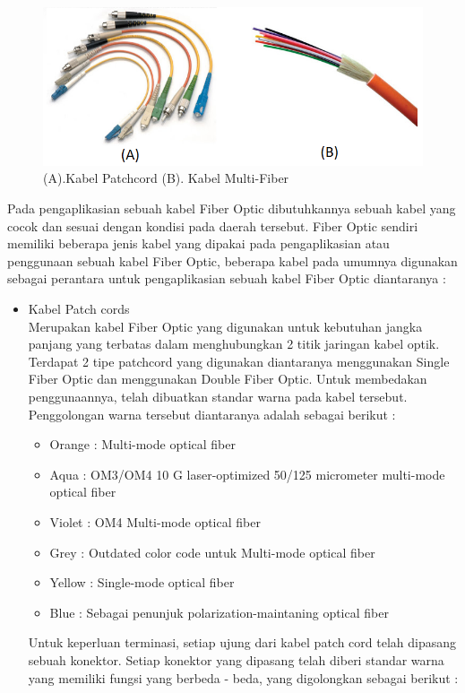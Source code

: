 \begin{flushleft}
\begin{figure}[ht]
\centerline{\includegraphics[width=1\textwidth]{figures/patchandmulti.png}}
\caption{(A).Kabel Patchcord  (B). Kabel Multi-Fiber}
\label{Skema Fiber Optic}
\end{figure}
Pada pengaplikasian sebuah kabel Fiber Optic dibutuhkannya sebuah kabel yang cocok dan sesuai dengan kondisi pada daerah tersebut. Fiber Optic sendiri memiliki beberapa jenis kabel yang dipakai pada pengaplikasian atau penggunaan sebuah kabel Fiber Optic, beberapa kabel pada umumnya digunakan sebagai perantara untuk pengaplikasian sebuah kabel Fiber Optic diantaranya : 
\begin{itemize}
\item Kabel Patch cords \\ Merupakan kabel Fiber Optic yang digunakan untuk kebutuhan jangka panjang yang terbatas dalam menghubungkan 2 titik jaringan kabel optik. Terdapat 2 tipe patchcord yang digunakan diantaranya menggunakan Single Fiber Optic dan menggunakan Double Fiber Optic. Untuk membedakan penggunaannya, telah dibuatkan standar warna pada kabel tersebut. Penggolongan warna tersebut diantaranya adalah sebagai berikut : \\
	\begin{itemize}
		\item Orange : Multi-mode optical fiber
		\item Aqua : OM3/OM4 10 G laser-optimized 50/125 micrometer multi-mode optical fiber
		\item Violet : OM4 Multi-mode optical fiber
		\item Grey : Outdated color code untuk Multi-mode optical fiber
		\item Yellow : Single-mode optical fiber
		\item Blue : Sebagai penunjuk polarization-maintaning optical fiber
	\end{itemize}
Untuk keperluan terminasi, setiap ujung dari kabel patch cord telah dipasang sebuah konektor. Setiap konektor yang dipasang telah diberi standar warna yang memiliki fungsi yang berbeda - beda, yang digolongkan sebagai berikut : \\

\end{itemize}
\end{flushleft}
